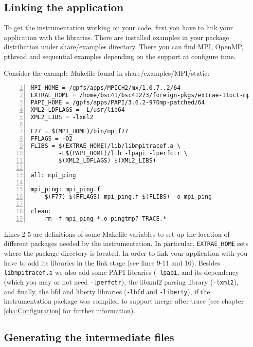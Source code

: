 \subsection{Linking the application}\label{subsec:Examples_static_link}

To get the instrumentation working on your code, first you have to link your application with the \TRACE libraries. There are installed examples in your package distribution under share/examples directory. There you can find MPI, OpenMP, pthread and sequential examples depending on the support at configure time.

Consider the example Makefile found in share/examples/MPI/static:

\begin{Verbatim}[frame=single,numbers=left,labelposition=topline,label=Makefile]
MPI_HOME = /gpfs/apps/MPICH2/mx/1.0.7..2/64
EXTRAE_HOME = /home/bsc41/bsc41273/foreign-pkgs/extrae-11oct-mpich2/64
PAPI_HOME = /gpfs/apps/PAPI/3.6.2-970mp-patched/64
XML2_LDFLAGS = -L/usr/lib64
XML2_LIBS = -lxml2

F77 = $(MPI_HOME)/bin/mpif77 
FFLAGS = -O2
FLIBS = $(EXTRAE_HOME)/lib/libmpitracef.a \
        -L$(PAPI_HOME)/lib -lpapi -lperfctr \
        $(XML2_LDFLAGS) $(XML2_LIBS)

all: mpi_ping

mpi_ping: mpi_ping.f
	$(F77) $(FFLAGS) mpi_ping.f $(FLIBS) -o mpi_ping

clean:
	rm -f mpi_ping *.o pingtmp? TRACE.*
\end{Verbatim}

Lines 2-5 are definitions of some Makefile variables to set up the location of different packages needed by the instrumentation. In particular, {\tt EXTRAE\_HOME} sets where the \TRACE package directory is located. In order to link your application with \TRACE you have to add its libraries in the link stage (see lines 9-11 and 16). Besides {\tt libmpitracef.a} we also add some PAPI libraries ({\tt -lpapi}, and its dependency (which you may or not need {\tt -lperfctr}), the libxml2 parsing library ({\tt -lxml2}), and finally, the bfd and liberty libraries ({\tt -lbfd} and {\tt -liberty}), if the instrumentation package was compiled to support merge after trace (see chapter \ref{cha:Configuration} for further information).

\subsection{Generating the intermediate files}\label{subsec:Examples_static_Intermediate}

